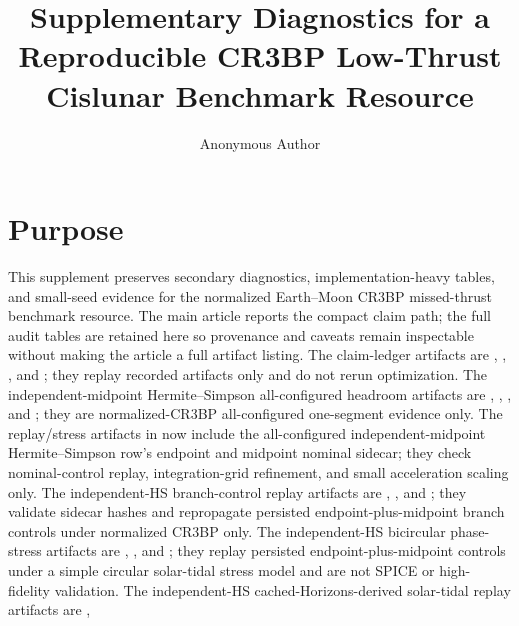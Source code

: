 \documentclass[11pt]{article}
\title{Supplementary Diagnostics for a Reproducible CR3BP Low-Thrust Cislunar Benchmark Resource}
\author{Anonymous Author}
\date{}
\begin{document}
\maketitle
\tableofcontents

\section*{Purpose}

This supplement preserves secondary diagnostics, implementation-heavy tables, and small-seed evidence for the normalized Earth--Moon CR3BP missed-thrust benchmark resource. The main article reports the compact claim path; the full audit tables are retained here so provenance and caveats remain inspectable without making the article a full artifact listing. The claim-ledger artifacts are , , , and ; they replay recorded artifacts only and do not rerun optimization. The independent-midpoint Hermite--Simpson all-configured headroom artifacts are , , , and ; they are normalized-CR3BP all-configured one-segment evidence only. The replay/stress artifacts in  now include the all-configured independent-midpoint Hermite--Simpson row's endpoint and midpoint nominal sidecar; they check nominal-control replay, integration-grid refinement, and small acceleration scaling only. The independent-HS branch-control replay artifacts are , , and ; they validate sidecar hashes and repropagate persisted endpoint-plus-midpoint branch controls under normalized CR3BP only. The independent-HS bicircular phase-stress artifacts are , , and ; they replay persisted endpoint-plus-midpoint controls under a simple circular solar-tidal stress model and are not SPICE or high-fidelity validation. The independent-HS cached-Horizons-derived solar-tidal replay artifacts are , 
\end{document}
